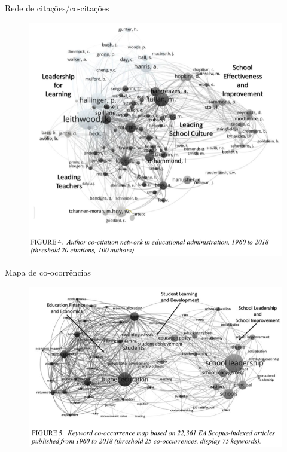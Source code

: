 \begin{frame}{Rede de citações/co-citações}
\begin{figure}
\centering
\includegraphics[scale=0.35]{figs/03/exemplo-1-4}
\end{figure}
\end{frame}

\begin{frame}{Mapa de co-ocorrências}
\begin{figure}
\centering
\includegraphics[scale=0.45]{figs/03/exemplo-1-5}
\end{figure}
\end{frame}

